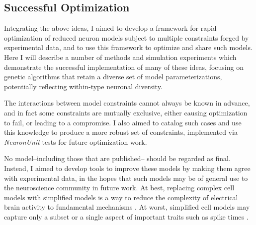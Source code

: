 \subsection{Successful Optimization} 
Integrating the above ideas, I aimed to develop a framework for rapid optimization of reduced neuron models subject to multiple constraints forged by experimental data, and to use this framework to optimize and share such models.
Here I will describe a number of methods and simulation experiments which demonstrate the successful implementation of many of these ideas, focusing on genetic algorithms that retain a diverse set of model parameterizations, potentially reflecting  within-type neuronal diversity.

The interactions between model constraints cannot always be known in advance, and in fact some constraints are mutually exclusive, either causing optimization to fail, or leading to a compromise. I also aimed to catalog such cases and use this knowledge to produce a more robust set of constraints, implemented via \emph{NeuronUnit} tests for future optimization work.

No model--including those that are published-- should be regarded as final.
Instead, I aimed to develop tools to improve these models by making them agree with experimental data, in the hopes that such models may be of general use to the neuroscience community in future work.
At best, replacing complex cell models with simplified models is a way to reduce the complexity of electrical brain activity to fundamental mechanisms \citep{teeter2018generalized}. At worst, simplified cell models may capture only a subset or a single aspect of important traits such as spike times \citep{hertag2012approximation}. %


